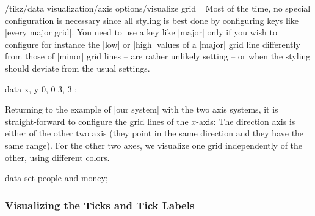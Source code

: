 \begin{key}{/tikz/data visualization/axis options/visualize grid=}
  Most of the time, no special configuration is necessary since all
  styling is best done by configuring keys like
  |every major grid|. You need to use a key like |major| only if you
  wish to configure for instance the |low| or |high| values of a
  |major| grid line differently from those of |minor| grid lines --
  are rather unlikely setting -- or when the styling should deviate
  from the usual settings.
\begin{codeexample}[]
\tikz \datavisualization [
    xy Cartesian,
    all axes={visualize axis={low=0, style=->},
              grid={some, minor steps between steps}},
    x axis=  {visualize grid={
                direction axis=y axis,
                minor={low=0.25, high=1.75, style=red!50}}},
    visualize as scatter]
  data {
    x, y
    0, 0
    3, 3
  };  
\end{codeexample}  
\end{key}

Returning to the example of |our system| with the two axis systems, it
is straight-forward to configure the grid lines of the $x$-axis: The
direction axis is either of the other two axis (they point in the same
direction and they have the same range). For the other two axes, we
visualize one grid independently of the other, using different colors.


\begin{codeexample}[]
\tikz \datavisualization [
    our system,
    x axis={attribute=time, length=3cm, grid=many},
    left axis ={attribute=money, grid=some},
    right axis={attribute=people, grid=few},
    visualize as line/.list={people 1, people 2, money 1, money 2}]
  data set {people and money};  
\end{codeexample}



\subsubsection{Visualizing the Ticks and Tick Labels}

\label{section-dv-visualize-ticks}


